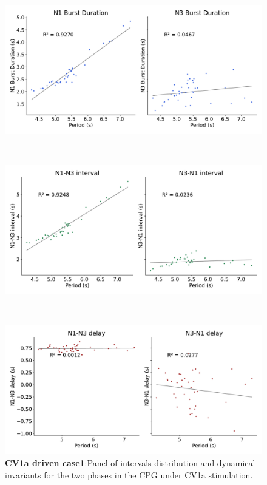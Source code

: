 \begin{figure}[htbp]
\begin{minipage}{0.9\textwidth}
\begin{minipage}[b]{0.55\textwidth}
			\centering
			\begin{minipage}[b]{\textwidth}
				\centering
				\includegraphics[width=\textwidth]{./invariants/data/SUSSEX/CV1a_driven1/images/stim_cv1a1_durations.pdf}
			\end{minipage}\\
			\begin{minipage}[b]{\textwidth}
				\centering
				\includegraphics[width=\textwidth]{./invariants/data/SUSSEX/CV1a_driven1/images/stim_cv1a1_intervals.pdf}
			\end{minipage}\\
			\begin{minipage}[b]{\textwidth}
				\centering
				\includegraphics[width=\textwidth]{./invariants/data/SUSSEX/CV1a_driven1/images/stim_cv1a1_delays.pdf}
			\end{minipage}
		\end{minipage}
	\end{minipage}
	\caption{\textbf{CV1a driven case1}:Panel of intervals distribution and dynamical invariants for the two phases in the CPG under CV1a stimulation.}
	\label{fig:cv1a 1 2phases}
\end{figure}





